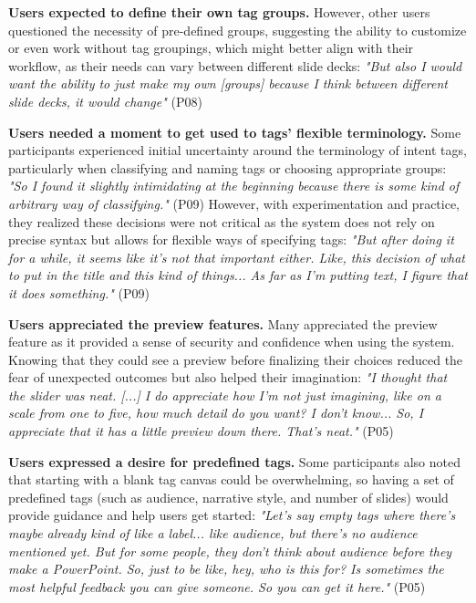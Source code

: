 \textbf{Users expected to define their own tag groups.}
However, other users questioned the necessity of pre-defined groups, suggesting the ability to customize or even work without tag groupings, which might better align with their workflow, as their needs can vary between different slide decks: \textit{"But also I would want the ability to just make my own [groups] because I think between different slide decks, it would change"} (P08)


\textbf{Users needed a moment to get used to tags' flexible terminology. }
Some participants experienced initial uncertainty around the terminology of intent tags, particularly when classifying and naming tags or choosing appropriate groups: \textit{"So I found it slightly intimidating at the beginning because there is some kind of arbitrary way of classifying."} (P09)
However, with experimentation and practice, they realized these decisions were not critical as the system does not rely on precise syntax but allows for flexible ways of specifying tags:
\textit{"But after doing it for a while, it seems like it's not that important either. Like, this decision of what to put in the title and this kind of things... As far as I'm putting text, I figure that it does something."} (P09)




\textbf{Users appreciated the preview features. }
Many appreciated the preview feature as it provided a sense of security and confidence when using the system. Knowing that they could see a preview before finalizing their choices reduced the fear of unexpected outcomes but also helped their imagination:
\textit{"I thought that the slider was neat. [...] I do appreciate how I'm not just imagining, like on a scale from one to five, how much detail do you want? I don't know... So, I appreciate that it has a little preview down there. That's neat."} (P05)

\textbf{Users expressed a desire for predefined tags. }
Some participants also noted that starting with a blank tag canvas could be overwhelming, so having a set of predefined tags (such as audience, narrative style, and number of slides) would provide guidance and help users get started: \textit{"Let's say empty tags where there's maybe already kind of like a label... like audience, but there's no audience mentioned yet. But for some people, they don't think about audience before they make a PowerPoint. So, just to be like, hey, who is this for? Is sometimes the most helpful feedback you can give someone. So you can get it here."} (P05)


